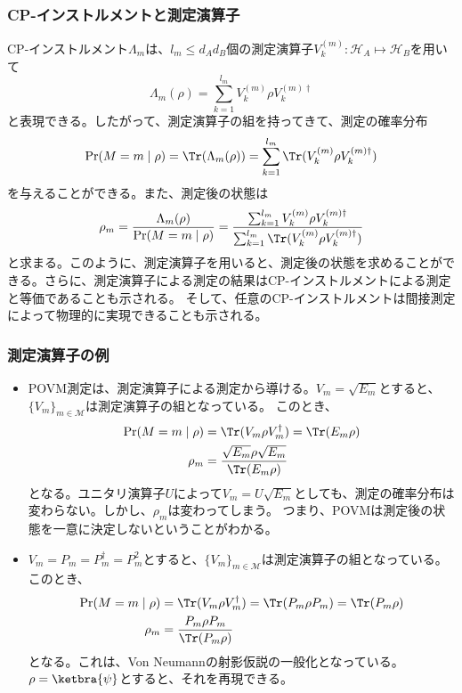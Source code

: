 \documentclass[10pt,aspectratio=169,xcolor=dvipsnames,table,dvipdfmx]{beamer}
\begin{document}
\begin{frame}
  \frametitle{CP-インストルメントと測定演算子}
  CP-インストルメント$\Lambda_m$は、$l_m\leq d_Ad_B$個の測定演算子$V_{k}^{(m)}\colon \mathcal{H}_A\mapsto \mathcal{H}_B$を用いて
  \begin{equation}
    \Lambda_m(\rho) = \sum_{k=1}^{l_m}V_{k}^{(m)}\rho V_{k}^{(m)\dagger}
  \end{equation}
  と表現できる。したがって、測定演算子の組を持ってきて、測定の確率分布
  \begin{equation}
    \Pr(M=m\mid \rho) = \Tr(\Lambda_m(\rho)) = \sum_{k=1}^{l_m}\Tr(V_{k}^{(m)}\rho V_{k}^{(m)\dagger})
  \end{equation}
  を与えることができる。また、測定後の状態は
  \begin{equation}
    \rho_m = \frac{\Lambda_m(\rho)}{\Pr(M=m\mid \rho)} = \frac{\sum_{k=1}^{l_m}V_{k}^{(m)}\rho V_{k}^{(m)\dagger}}{\sum_{k=1}^{l_m}\Tr(V_{k}^{(m)}\rho V_{k}^{(m)\dagger})}
  \end{equation}
  と求まる。このように、測定演算子を用いると、測定後の状態を求めることができる。さらに、測定演算子による測定の結果はCP-インストルメントによる測定と等価であることも示される。
  そして、任意のCP-インストルメントは間接測定によって物理的に実現できることも示される。
\end{frame}

\begin{frame}
  \frametitle{測定演算子の例}
  \begin{itemize}
    \item POVM測定は、測定演算子による測定から導ける。$V_m = \sqrt{E_m}$とすると、$\{V_m\}_{m\in \mathcal{M}}$は測定演算子の組となっている。
    このとき、
    \begin{align}
      \Pr(M=m\mid \rho) &= \Tr(V_m\rho V_m^{\dagger}) = \Tr(E_m\rho) \\
      \rho_m & = \frac{\sqrt{E_m}\rho \sqrt{E_m}}{\Tr(E_m\rho)}
    \end{align}
    となる。ユニタリ演算子$U$によって$V_m = U\sqrt{E_m}$としても、測定の確率分布は変わらない。しかし、$\rho_m$は変わってしまう。
    つまり、POVMは測定後の状態を一意に決定しないということがわかる。
    \item $V_m = P_m = P_m^{\dagger} = P_m^2$とすると、$\{V_m\}_{m\in \mathcal{M}}$は測定演算子の組となっている。
    このとき、
    \begin{align}
      \Pr(M=m\mid \rho) &= \Tr(V_m\rho V_m^{\dagger}) = \Tr(P_m\rho P_m) = \Tr(P_m\rho) \\
      \rho_m & = \frac{P_m\rho P_m}{\Tr(P_m\rho)}
    \end{align}
    となる。これは、Von Neumannの射影仮説の一般化となっている。$\rho=\ketbra{\psi}$とすると、それを再現できる。
  \end{itemize}

 
  

\end{frame}
\end{document}
